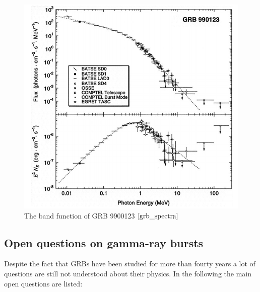 \documentclass[12pt, a4paper,titlepage]{article}
\numberwithin{equation}{section}
\numberwithin{figure}{section}
\begin{document}
\begin{figure}[H]
\centering
\includegraphics[width=130.0mm]{images/grb_spectra.png}
\caption{The band function of GRB 9900123 $\cite{grb_spectra}$}
\label{fig:grb_band}
\end{figure}

\subsection{Open questions on gamma-ray bursts}


Despite the fact that GRBs have been studied for more than fourty years a lot of questions are still not understood about their physics\cite{grb19}. In the following the main open questions are listed:
\end{document}
